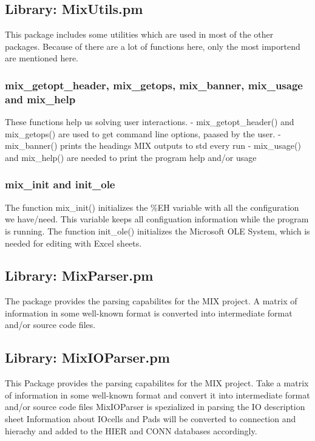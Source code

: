 \documentclass[a4paper,12pt]{article}
\begin{document}
\subsection{Library: MixUtils.pm}
This package includes some utilities which are used in most of the other packages. Because of there are a lot of functions here, only the most importend are mentioned here.

\subsubsection{mix\_getopt\_header, mix\_getops, mix\_banner, mix\_usage and mix\_help}
These functions help us solving user interactions.\newline
\hspace*{10mm}- mix\_getopt\_header() and mix\_getops() are used to get command line options, paased by the user.
\hspace*{10mm}- mix\_banner() prints the headings MIX outputs to std every run
\hspace*{10mm}- mix\_usage() and mix\_help() are needed to print the program help and/or usage

\subsubsection{mix\_init and init\_ole}
The function mix\_init() initializes the \%EH variable with all the configuration we have/need. This variable keeps all configuation information while the program is running.\newline
The function init\_ole() initializes the Microsoft OLE System, which is needed for editing with Excel sheets.
\subsubsection{}

\subsection{Library: MixParser.pm}
The package provides the parsing capabilites for the MIX project. A matrix of information in some well-known format is converted into intermediate format and/or source code files.

\subsection{Library: MixIOParser.pm}
This Package provides the parsing capabilites for the MIX project. Take a matrix of information in some well-known format and convert it into intermediate format and/or source code files MixIOParser is spezialized in parsing the IO description sheet Information about IOcells and Pads will be converted to connection and hierachy and added to the HIER and CONN databases accordingly.
\end{document}
